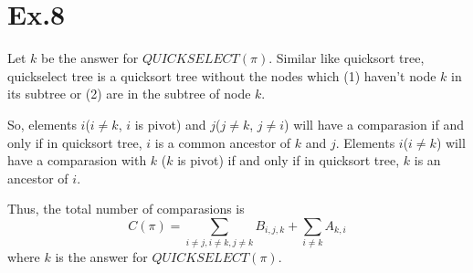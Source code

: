 \section{Ex.8}
	Let $k$ be the answer for $QUICKSELECT(\pi)$. Similar like quicksort tree, quickselect tree is a quicksort tree without the nodes which (1) haven't node $k$ in its subtree or (2) are in the subtree of node $k$.\par
	So, elements $i$($i\neq k$, $i$ is pivot) and $j$($j\neq k$, $j\neq i$) will have a comparasion if and only if in quicksort tree, $i$ is a common ancestor of $k$ and $j$. Elements $i$($i\neq k$) will have a comparasion with $k$ ($k$ is pivot) if and only if in quicksort tree, $k$ is an ancestor of $i$.\par
	Thus, the total number of comparasions is $$C(\pi) = \sum_{i\neq j, i\neq k, j\neq k}B_{i,j,k}+\sum_{i\neq k}A_{k,i}$$ where $k$ is the answer for $QUICKSELECT(\pi)$.